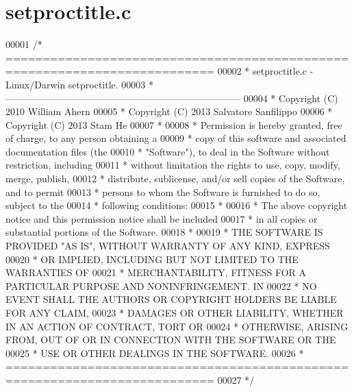 \hypertarget{setproctitle_8c_source}{}\section{setproctitle.\+c}
\label{setproctitle_8c_source}

\begin{DoxyCode}
00001 \textcolor{comment}{/* ==========================================================================}
00002 \textcolor{comment}{ * setproctitle.c - Linux/Darwin setproctitle.}
00003 \textcolor{comment}{ * --------------------------------------------------------------------------}
00004 \textcolor{comment}{ * Copyright (C) 2010  William Ahern}
00005 \textcolor{comment}{ * Copyright (C) 2013  Salvatore Sanfilippo}
00006 \textcolor{comment}{ * Copyright (C) 2013  Stam He}
00007 \textcolor{comment}{ *}
00008 \textcolor{comment}{ * Permission is hereby granted, free of charge, to any person obtaining a}
00009 \textcolor{comment}{ * copy of this software and associated documentation files (the}
00010 \textcolor{comment}{ * "Software"), to deal in the Software without restriction, including}
00011 \textcolor{comment}{ * without limitation the rights to use, copy, modify, merge, publish,}
00012 \textcolor{comment}{ * distribute, sublicense, and/or sell copies of the Software, and to permit}
00013 \textcolor{comment}{ * persons to whom the Software is furnished to do so, subject to the}
00014 \textcolor{comment}{ * following conditions:}
00015 \textcolor{comment}{ *}
00016 \textcolor{comment}{ * The above copyright notice and this permission notice shall be included}
00017 \textcolor{comment}{ * in all copies or substantial portions of the Software.}
00018 \textcolor{comment}{ *}
00019 \textcolor{comment}{ * THE SOFTWARE IS PROVIDED "AS IS", WITHOUT WARRANTY OF ANY KIND, EXPRESS}
00020 \textcolor{comment}{ * OR IMPLIED, INCLUDING BUT NOT LIMITED TO THE WARRANTIES OF}
00021 \textcolor{comment}{ * MERCHANTABILITY, FITNESS FOR A PARTICULAR PURPOSE AND NONINFRINGEMENT. IN}
00022 \textcolor{comment}{ * NO EVENT SHALL THE AUTHORS OR COPYRIGHT HOLDERS BE LIABLE FOR ANY CLAIM,}
00023 \textcolor{comment}{ * DAMAGES OR OTHER LIABILITY, WHETHER IN AN ACTION OF CONTRACT, TORT OR}
00024 \textcolor{comment}{ * OTHERWISE, ARISING FROM, OUT OF OR IN CONNECTION WITH THE SOFTWARE OR THE}
00025 \textcolor{comment}{ * USE OR OTHER DEALINGS IN THE SOFTWARE.}
00026 \textcolor{comment}{ * ==========================================================================}
00027 \textcolor{comment}{ */}

\end{DoxyCode}
